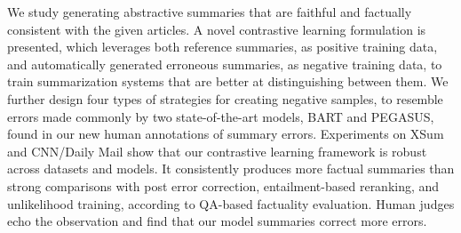 We study generating abstractive summaries that are faithful and factually consistent with the given articles. A novel contrastive learning formulation is presented, which leverages both reference summaries, as positive training data, and automatically generated erroneous summaries, as negative training data, to train summarization systems that are better at distinguishing between them. We further design four types of strategies for creating negative samples, to resemble errors made commonly by two state-of-the-art models, BART and PEGASUS, found in our new human annotations of summary errors. Experiments on XSum and CNN/Daily Mail show that our contrastive learning framework is robust across datasets and models. It consistently produces more factual summaries than strong comparisons with post error correction, entailment-based reranking, and unlikelihood training, according to QA-based factuality evaluation. Human judges echo the observation and find that our model summaries correct more errors.

